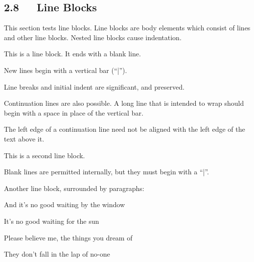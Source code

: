 \documentclass[a4paper]{article}
\newenvironment{DUlineblock}[1]{%
    \list{}{\setlength{\partopsep}{\parskip}
            \addtolength{\partopsep}{\baselineskip}
            \setlength{\topsep}{0pt}
            \setlength{\itemsep}{0.15\baselineskip}
            \setlength{\parsep}{0pt}
            \setlength{\leftmargin}{#1}}
    \raggedright
  }
  {\endlist}
\begin{document}
\subsection{2.8   Line Blocks%
  \label{line-blocks}%
}

This section tests line blocks.  Line blocks are body elements which
consist of lines and other line blocks.  Nested line blocks cause
indentation.

\begin{DUlineblock}{0em}
\item[] This is a line block.  It ends with a blank line.
\item[]
\begin{DUlineblock}{\DUlineblockindent}
\item[] New lines begin with a vertical bar (“|”).
\item[] Line breaks and initial indent are significant, and preserved.
\item[]
\begin{DUlineblock}{\DUlineblockindent}
\item[] Continuation lines are also possible.  A long line that is intended
to wrap should begin with a space in place of the vertical bar.
\end{DUlineblock}
\item[] The left edge of a continuation line need not be aligned with
the left edge of the text above it.
\end{DUlineblock}
\end{DUlineblock}

\begin{DUlineblock}{0em}
\item[] This is a second line block.
\item[] 
\item[] Blank lines are permitted internally, but they must begin with a “|”.
\end{DUlineblock}

Another line block, surrounded by paragraphs:

\begin{DUlineblock}{0em}
\item[] And it’s no good waiting by the window
\item[] It’s no good waiting for the sun
\item[] Please believe me, the things you dream of
\item[] They don’t fall in the lap of no-one
\end{DUlineblock}
\end{document}
